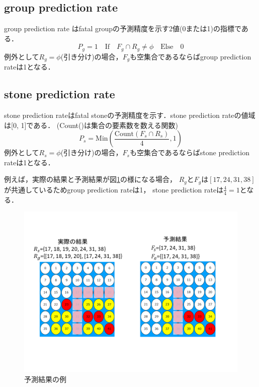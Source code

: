 \subsection{group prediction rate}
group prediction rate はfatal groupの予測精度を示す2値(0または1)の指標である．
\begin{equation}
	{P_g = 1 \quad \textrm{If} \quad F_g \cap R_g \ne \phi \quad \textrm{Else} \quad 0}
\end{equation}
例外として$R_g=\phi$(引き分け)の場合，$F_g$も空集合であるならばgroup prediction rateは1となる．
\subsection{stone prediction rate}
stone prediction rateはfatal stoneの予測精度を示す．stone prediction rateの値域は[0, 1]である．
(Count()は集合の要素数を数える関数)
\begin{equation}
	{P_s = \textrm{Min}(\frac{\textrm{Count}(F_s \cap R_s)}{4}, 1)  }
\end{equation}
例外として$R_s=\phi$(引き分け)の場合，$F_s$も空集合であるならばstone prediction rateは1となる．


例えば，実際の結果と予測結果が図\ref{fig:cal-compare}の様になる場合， $R_g$と$F_g$は$[17, 24, 31, 38]$が共通しているためgroup prediction rateは1， stone prediction rateは$\frac{4}{4}=1$となる．
\pagebreak
\begin{figure}[htbp]
	\centering
	\includegraphics[width=\linewidth]{./figure/cal-compare.png}
	\caption{予測結果の例}
	\label{fig:cal-compare}
\end{figure}


